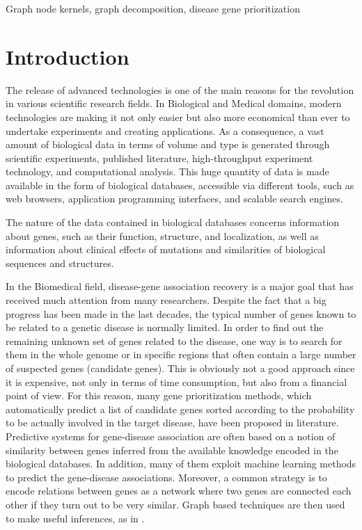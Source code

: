 \documentclass[review]{elsarticle}
\begin{document}
\begin{frontmatter}
\begin{keyword}
Graph node kernels, graph decomposition, disease gene prioritization
\end{keyword}
\end{frontmatter}

\linenumbers
\section{Introduction}
The release of advanced technologies is one of the main reasons for the
revolution in various scientific research fields. In Biological and Medical
domains, modern technologies are making it not only easier but also more
economical than ever to undertake experiments and creating applications.
As a consequence, a vast amount of biological data in terms of volume
and type is generated through scientific experiments, published literature,
high-throughput experiment technology, and computational analysis. 
This huge quantity of data is made available in the form of biological databases, accessible via different 
tools, such as web browsers, application programming interfaces, and scalable search
engines.
 
The nature of the data contained in biological databases concerns information about genes, such as their function, structure, and localization, as well as information about clinical effects of mutations and similarities of biological sequences and structures.

In the Biomedical field, disease-gene association recovery is a major goal that has received much attention from many researchers. Despite the fact that a big progress has been made in the last decades, the typical number of genes known to be related to a genetic disease is normally limited. In order to find out the remaining unknown set of genes related to the disease, one way is to search for them  in the whole genome or in specific regions that often contain a large number of suspected genes (candidate genes). This is obviously not a good approach since it is expensive, not only in terms of time consumption, but also from a financial point of view. For this reason, many gene prioritization methods, which automatically predict a list of candidate genes sorted according to the probability to be actually involved in the target disease, have been proposed in literature. Predictive systems for gene-disease association are often based on a notion of similarity between genes inferred from the available knowledge encoded in the biological databases. In addition, many of them exploit machine learning methods to predict the gene-disease associations. Moreover, a common strategy is to encode relations between genes as a network where two genes are connected each other if they turn out to be very similar. Graph based techniques are then used to make useful inferences, as in \cite{mordelet2011prodige, chen2014disease,valentini2014extensive}.
\end{document}
